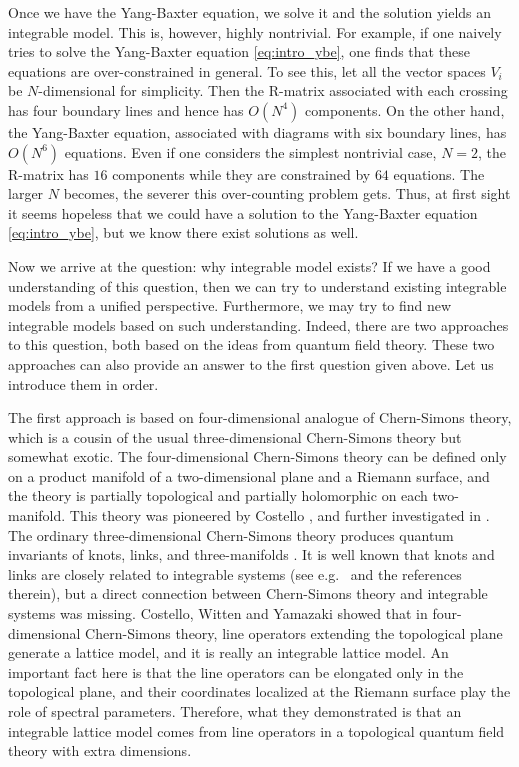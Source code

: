 Once we have the Yang-Baxter equation, we solve it and the solution yields an
integrable model.
This is, however, highly nontrivial.
For example, if one naively tries to solve the Yang-Baxter equation \eqref{eq:intro_ybe},
one finds that these equations are over-constrained in general.
To see this, let all the vector spaces $V_i$ be $N$-dimensional for simplicity.
Then the R-matrix associated with each crossing has four boundary lines and hence
has $O(N^4)$ components.
On the other hand, the Yang-Baxter equation, associated with diagrams with six boundary lines,
has $O(N^6)$ equations.
Even if one considers the simplest nontrivial case, $N=2$, the R-matrix has $16$ components
while they are constrained by $64$ equations.
The larger $N$ becomes, the severer this over-counting problem gets.
Thus, at first sight it seems hopeless that we could have a solution to the Yang-Baxter equation
\eqref{eq:intro_ybe},
but we know there exist solutions as well.


Now we arrive at the question: why integrable model exists?
If we have a good understanding of this question, then we can try to understand existing
integrable models from a unified perspective.
Furthermore, we may try to find new integrable models based on such understanding.
%
Indeed, there are two approaches to this question, both based on the ideas from quantum
field theory.
These two approaches can also provide an answer to the first question given above.
Let us introduce them in order.


The first approach is based on four-dimensional analogue of Chern-Simons theory,
which is a cousin of the usual three-dimensional Chern-Simons theory but somewhat exotic.
The four-dimensional Chern-Simons theory can be defined only on a product manifold of a two-dimensional plane
and a Riemann surface, and the theory is partially topological and partially holomorphic on each two-manifold.
This theory was pioneered by Costello \cite{Costello:2013zra,Costello:2013sla},
and further investigated in \cite{Costello:2017dso,Costello:2018gyb,Costello:2019tri}.
The ordinary three-dimensional Chern-Simons theory produces
quantum invariants of knots, links, and three-manifolds \cite{Witten:1988hf}.
It is well known that knots and links are closely related to integrable systems
(see e.g.~\cite{Wadati:1989ud} and the references therein),
but a direct connection between Chern-Simons theory and integrable systems was missing.
Costello, Witten and Yamazaki showed that in four-dimensional Chern-Simons theory, line operators
extending the topological plane generate a lattice model, and it is really an integrable lattice model.
An important fact here is that the line operators can be elongated only in the topological plane,
and their coordinates localized at the Riemann surface play the role of spectral parameters.
Therefore, what they demonstrated is that an integrable lattice model comes from line operators in a topological
quantum field theory with extra dimensions.


